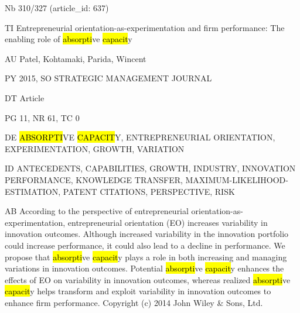 \documentclass[a4paper]{article}
\begin{document}
\vspace*{-2cm}
Nb \tabto{0cm}310/327 (article\_id: 637)\par
TI \tabto{0cm}Entrepreneurial orientation-as-experimentation and firm performance: The enabling role of \hl{absorpti}ve \hl{capacit}y\par
AU \tabto{0cm}Patel, Kohtamaki, Parida, Wincent\par
PY \tabto{0cm}2015, SO STRATEGIC MANAGEMENT JOURNAL\par
DT \tabto{0cm}Article\par
PG \tabto{0cm}11, NR 61, TC 0\par
DE \tabto{0cm}\hl{ABSORPTI}VE \hl{CAPACIT}Y, ENTREPRENEURIAL ORIENTATION, EXPERIMENTATION, GROWTH, VARIATION\par
ID \tabto{0cm}ANTECEDENTS, CAPABILITIES, GROWTH, INDUSTRY, INNOVATION PERFORMANCE, KNOWLEDGE TRANSFER, MAXIMUM-LIKELIHOOD-ESTIMATION, PATENT CITATIONS, PERSPECTIVE, RISK\par
AB \tabto{0cm}According to the perspective of entrepreneurial orientation-as-experimentation, entrepreneurial orientation (EO) increases variability in innovation outcomes. Although increased variability in the innovation portfolio could increase performance, it could also lead to a decline in performance. We propose that \hl{absorpti}ve \hl{capacit}y plays a role in both increasing and managing variations in innovation outcomes. Potential \hl{absorpti}ve \hl{capacit}y enhances the effects of EO on variability in innovation outcomes, whereas realized \hl{absorpti}ve \hl{capacit}y helps transform and exploit variability in innovation outcomes to enhance firm performance. Copyright (c) 2014 John Wiley \& Sons, Ltd.\par
\clearpage
\end{document}
